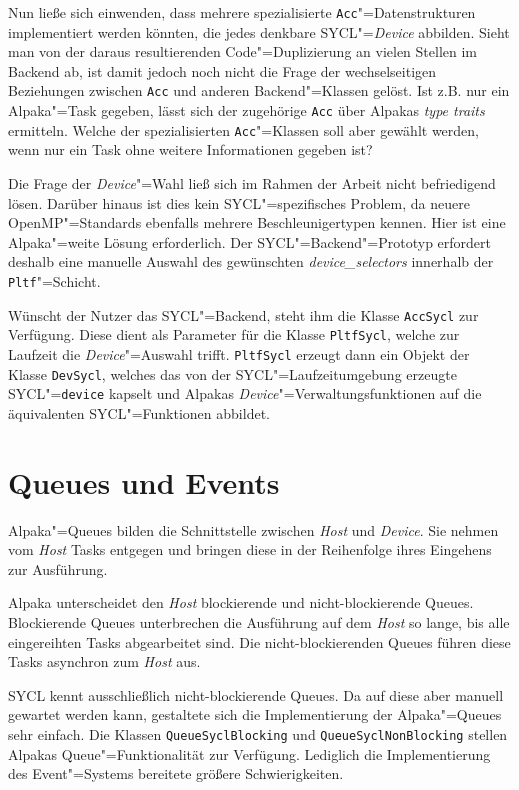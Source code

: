 Nun ließe sich einwenden, dass mehrere spezialisierte
\texttt{Acc}"=Datenstrukturen implementiert werden könnten, die jedes denkbare
SYCL"=\textit{Device} abbilden. Sieht man von der daraus resultierenden
Code"=Duplizierung an vielen Stellen im Backend ab, ist damit jedoch noch nicht
die Frage der wechselseitigen Beziehungen zwischen \texttt{Acc} und anderen
Backend"=Klassen gelöst. Ist z.B. nur ein Alpaka"=Task gegeben, lässt sich der
zugehörige \texttt{Acc} über Alpakas \textit{type traits} ermitteln. Welche der
spezialisierten \texttt{Acc}"=Klassen soll aber gewählt werden, wenn nur ein
Task ohne weitere Informationen gegeben ist?

Die Frage der \textit{Device}"=Wahl ließ sich im Rahmen der Arbeit nicht
befriedigend lösen. Darüber hinaus ist dies kein SYCL"=spezifisches Problem,
da neuere OpenMP"=Standards ebenfalls mehrere Beschleunigertypen kennen. Hier
ist eine Alpaka"=weite Lösung erforderlich. Der SYCL"=Backend"=Prototyp
erfordert deshalb eine manuelle Auswahl des gewünschten
\textit{device\_selectors} innerhalb der \texttt{Pltf}"=Schicht.

Wünscht der Nutzer das SYCL"=Backend, steht ihm die Klasse \texttt{AccSycl} zur
Verfügung. Diese dient als Parameter für die Klasse \texttt{PltfSycl}, welche
zur Laufzeit die \textit{Device}"=Auswahl trifft. \texttt{PltfSycl} erzeugt
dann ein Objekt der Klasse \texttt{DevSycl}, welches das von der
SYCL"=Laufzeitumgebung erzeugte SYCL"=\texttt{device} kapselt und Alpakas
\textit{Device}"=Verwaltungsfunktionen auf die äquivalenten SYCL"=Funktionen
abbildet.

\section{Queues und Events}
\label{implementierung:queue}

Alpaka"=Queues bilden die Schnittstelle zwischen \textit{Host} und
\textit{Device}. Sie nehmen vom \textit{Host} Tasks entgegen und bringen diese
in der Reihenfolge ihres Eingehens zur Ausführung.

Alpaka unterscheidet den \textit{Host} blockierende und nicht-blockierende
Queues. Blockierende Queues unterbrechen die Ausführung auf dem \textit{Host} so
lange, bis alle eingereihten Tasks abgearbeitet sind. Die nicht-blockierenden
Queues führen diese Tasks asynchron zum \textit{Host} aus.

SYCL kennt ausschließlich nicht-blockierende Queues. Da auf diese aber manuell
gewartet werden kann, gestaltete sich die Implementierung der Alpaka"=Queues
sehr einfach. Die Klassen \texttt{QueueSyclBlocking} und
\texttt{QueueSyclNonBlocking} stellen Alpakas Queue"=Funktionalität zur
Verfügung. Lediglich die Implementierung des Event"=Systems bereitete größere
Schwierigkeiten.

